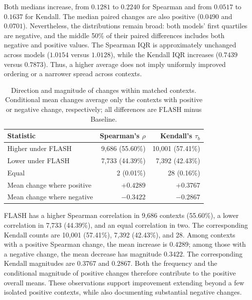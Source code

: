 \documentclass{article} %
\begin{document}
Both medians increase, from $0.1281$ to $0.2240$ for Spearman and from $0.0517$ to $0.1637$ for Kendall. The median paired changes are also positive ($0.0490$ and $0.0701$). Nevertheless, the distributions remain broad: both models' first quartiles are negative, and the middle 50\% of their paired differences includes both negative and positive values. The Spearman IQR is approximately unchanged across models ($1.0154$ versus $1.0128$), while the Kendall IQR increases ($0.7439$ versus $0.7873$). Thus, a higher average does not imply uniformly improved ordering or a narrower spread across contexts.


\begin{table}[!t]
\centering
\small
\caption{Direction and magnitude of changes within matched contexts. Conditional mean changes average only the contexts with positive or negative change, respectively; all differences are FLASH minus Baseline.}
\label{tab:value_context_changes}
\begin{tabular}{lrr}
\toprule
Statistic & Spearman's $\rho$ & Kendall's $\tau_b$ \\
\midrule
Higher under FLASH & 9,686 (55.60\%) & 10,001 (57.41\%) \\
Lower under FLASH & 7,733 (44.39\%) & 7,392 (42.43\%) \\
Equal & 2 (0.01\%) & 28 (0.16\%) \\
Mean change where positive & $+0.4289$ & $+0.3767$ \\
Mean change where negative & $-0.3422$ & $-0.2867$ \\
\bottomrule
\end{tabular}
\end{table}

FLASH has a higher Spearman correlation in 9,686 contexts (55.60\%), a lower correlation in 7,733 (44.39\%), and an equal correlation in two. The corresponding Kendall counts are 10,001 (57.41\%), 7,392 (42.43\%), and 28. Among contexts with a positive Spearman change, the mean increase is $0.4289$; among those with a negative change, the mean decrease has magnitude $0.3422$. The corresponding Kendall magnitudes are $0.3767$ and $0.2867$. Both the frequency and the conditional magnitude of positive changes therefore contribute to the positive overall means. These observations support improvement extending beyond a few isolated positive contexts, while also documenting substantial negative changes.
\end{document}
